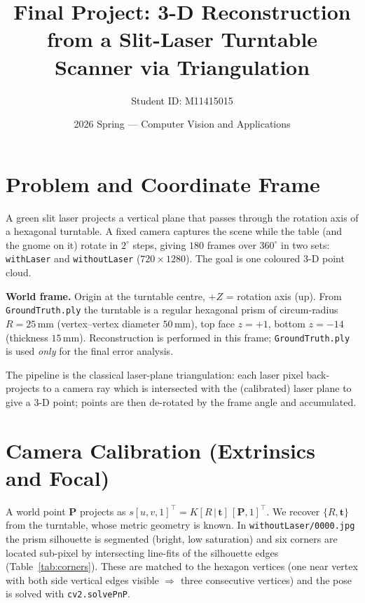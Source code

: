 \documentclass[11pt,a4paper]{article}
\title{\vspace{-1.2em}\textbf{Final Project: 3-D Reconstruction from a Slit-Laser
       Turntable Scanner via Triangulation}}
\author{Student ID: M11415015}
\date{2026 Spring --- Computer Vision and Applications}
\begin{document}
\maketitle
\vspace{-2.2em}

\section{Problem and Coordinate Frame}
A green slit laser projects a vertical plane that passes through the rotation
axis of a hexagonal turntable. A fixed camera captures the scene while the table
(and the gnome on it) rotate in $2^\circ$ steps, giving $180$ frames over
$360^\circ$ in two sets: \texttt{withLaser} and \texttt{withoutLaser}
($720\times1280$). The goal is one coloured 3-D point cloud.

\textbf{World frame.} Origin at the turntable centre, $+Z$ = rotation axis (up).
From \texttt{GroundTruth.ply} the turntable is a regular hexagonal prism of
circum-radius $R=25$\,mm (vertex--vertex diameter $50$\,mm), top face $z=+1$,
bottom $z=-14$ (thickness $15$\,mm). Reconstruction is performed in this frame;
\texttt{GroundTruth.ply} is used \emph{only} for the final error analysis.

The pipeline is the classical laser-plane triangulation: each laser pixel
back-projects to a camera ray which is intersected with the (calibrated) laser
plane to give a 3-D point; points are then de-rotated by the frame angle and
accumulated.

\section{Camera Calibration (Extrinsics and Focal)}
A world point $\mathbf{P}$ projects as $s[u,v,1]^\top=K[R\,|\,\mathbf{t}]\,
[\mathbf{P},1]^\top$. We recover $\{R,\mathbf t\}$ from the turntable, whose
metric geometry is known. In \texttt{withoutLaser/0000.jpg} the prism silhouette
is segmented (bright, low saturation) and six corners are located sub-pixel by
intersecting line-fits of the silhouette edges (Table~\ref{tab:corners}). These
are matched to the hexagon vertices (one near vertex with both side vertical
edges visible $\Rightarrow$ three consecutive vertices) and the pose is solved
with \texttt{cv2.solvePnP}.
\end{document}
